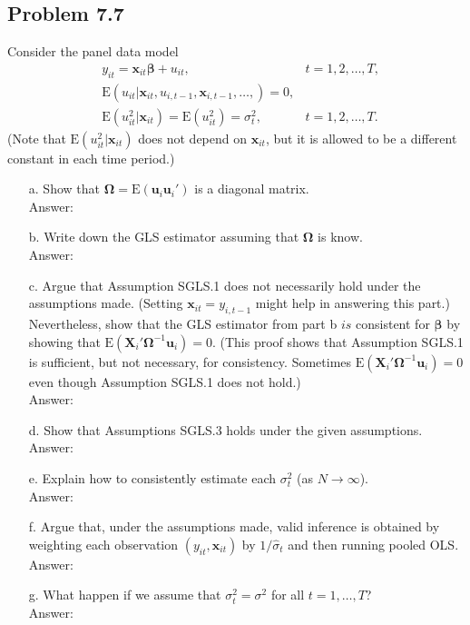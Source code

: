 \documentclass[10pt]{article}
\newcommand{\E}{\text{E}}
\begin{document}
\subsection*{Problem 7.7}
Consider the panel data model
\begin{align*}
    &y_{it}=\textbf{x}_{it}\pmb{\beta}+u_{it},  &t=1,2,\ldots,T, \\
    &\E(u_{it}|\textbf{x}_{it},u_{i,t-1},\textbf{x}_{i,t-1},\ldots,)=0, &\\
    &\E(u_{it}^2|\textbf{x}_{it})=\E(u_{it}^2)=\sigma_t^2, &t=1,2,\ldots,T.
\end{align*}
(Note that $\E(u_{it}^2|\textbf{x}_{it})$ does not depend on $\textbf{x}_{it}$, but it is allowed to be a different constant in each time period.)
\begin{enumerate}
\item[a.] Show that $\pmb{\Omega}= \E(\textbf{u}_i\textbf{u}_i')$ is a diagonal matrix.
\\ Answer: \\

\item[b.] Write down the GLS estimator assuming that $\pmb{\Omega}$ is know.
\\ Answer: \\

\item[c.] Argue that Assumption SGLS.1 does not necessarily hold under the assumptions made. (Setting $\textbf{x}_{it}=y_{i,t-1}$ might help in answering this part.) Nevertheless, show that the GLS estimator from part b $is$ consistent for $\pmb{\beta}$ by showing that $\E(\textbf{X}_i'\pmb{\Omega}^{-1}\textbf{u}_i)=0.$ (This proof shows that Assumption SGLS.1 is sufficient, but not necessary, for consistency. Sometimes $\E(\textbf{X}_i'\pmb{\Omega}^{-1}\textbf{u}_i)=0$ even though Assumption SGLS.1 does not hold.)
\\ Answer: \\

\item[d.] Show that Assumptions SGLS.3 holds under the given assumptions.
\\ Answer: \\

\item[e.] Explain how to consistently estimate each $\sigma_t^2$ (as $N\to \infty$).
\\ Answer: \\

\item[f.] Argue that, under the assumptions made, valid inference is obtained by weighting each observation $(y_{it},\textbf{x}_{it})$ by $1/\hat{\sigma}_t$ and then running pooled OLS.
\\ Answer: \\

\item[g.] What happen if we assume that $\sigma_t^2=\sigma^2$ for all $t=1,\ldots,T$?
\\ Answer: \\

\end{enumerate}
\end{document}
